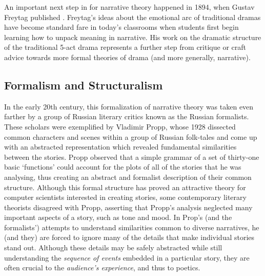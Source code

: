 An important next step in for narrative theory happened in 1894, when Gustav Freytag published  \citep{Freytag1894}.
%
Freytag's ideas about the emotional arc of traditional dramas have become standard fare in today's classrooms when students first begin learning how to unpack meaning in narrative.
%
His work on the dramatic structure of the traditional 5-act drama represents a further step from critique or craft advice towards more formal theories of drama (and more generally, narrative).


\subsection{Formalism and Structuralism}

In the early 20th century, this formalization of narrative theory was taken even farther by a group of Russian literary critics known as the Russian formalists.
%
These scholars were exemplified by Vladimir Propp, whose 1928  \citep{Propp1971} dissected common characters and scenes within a group of Russian folk-tales and come up with an abstracted representation which revealed fundamental similarities between the stories.
%
Propp observed that a simple grammar of a set of thirty-one basic `functions' could account for the plots of all of the stories that he was analysing, thus creating an abstract and formalist description of their common structure.
%
Although this formal structure has proved an attractive theory for computer scientists interested in creating stories, some contemporary literary theorists disagreed with Propp, asserting that Propp's analysis neglected many important aspects of a story, such as tone and mood.
%
In Prop's (and the formalists') attempts to understand similarities common to diverse narratives, he (and they) are forced to ignore many of the details that make individual stories stand out.
%
Although these details may be safely abstracted while still understanding the \emph{sequence of events} embedded in a particular story, they are often crucial to the \emph{audience's experience}, and thus to poetics.


